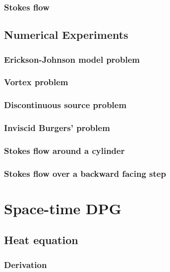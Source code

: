 \documentclass[12pt]{report}
\begin{document}
\subsection{Stokes flow}


\section{Numerical Experiments}

\subsection{Erickson-Johnson model problem}

\subsection{Vortex problem}

\subsection{Discontinuous source problem}

\subsection{Inviscid Burgers' problem}

\subsection{Stokes flow around a cylinder}

\subsection{Stokes flow over a backward facing step}



\chapter{Space-time DPG}



\section{Heat equation}

\subsection{Derivation}
\end{document}
